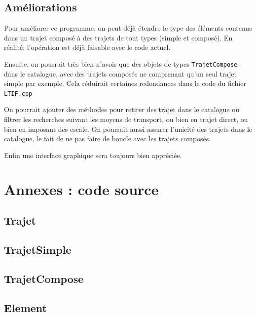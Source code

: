 \documentclass[11pt, a4paper]{article}
\begin{document}
\subsection{Améliorations}
Pour améliorer ce programme, on peut déjà étendre le type des éléments contenus dans un trajet
composé à des trajets de tout types (simple et composé). En réalité, l'opération est déjà faisable
avec le code actuel.

Ensuite, on pourrait très bien n'avoir que des objets de types
\texttt{TrajetCompose} dans le catalogue, avec des trajets composés ne comprenant qu'un seul trajet
simple par exemple. Cela réduirait certaines redondances dans le code du fichier \texttt{LTIF.cpp}

On pourrait ajouter des méthodes pour retirer des trajet dans le catalogue ou filtrer les recherches
suivant les moyens de transport, ou bien en trajet direct, ou bien en imposant des escale.
On pourrait aussi assurer l'unicité des trajets dans le catalogue, le fait de ne pas faire de boucle
avec les trajets composés.

Enfin une interface graphique sera toujours bien appréciée.
\newpage
\section{Annexes : code source}
\subsection{Trajet}

\subsection{TrajetSimple}


\newpage
\subsection{TrajetCompose}


\subsection{Element}


\newpage
\end{document}
